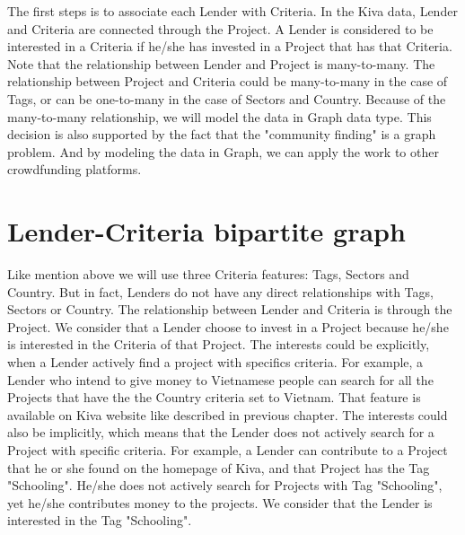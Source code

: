 The first steps is to associate each Lender with Criteria.
In the Kiva data, Lender and Criteria are connected through the Project.
A Lender is considered to be interested in a Criteria if he/she has invested in a Project that has that Criteria.
Note that the relationship between Lender and Project is many-to-many.
The relationship between Project and Criteria could be many-to-many in the case of Tags,
or can be one-to-many in the case of Sectors and Country.
Because of the many-to-many relationship, we will model the data in Graph data type.
This decision is also supported by the fact that the "community finding" is a graph problem.
And by modeling the data in Graph, we can apply the work to other crowdfunding platforms.

\section{Lender-Criteria bipartite graph}

Like mention above we will use three Criteria features: Tags, Sectors and Country.
But in fact, Lenders do not have any direct relationships with Tags, Sectors or Country.
The relationship between Lender and Criteria is through the Project.
We consider that a Lender choose to invest in a Project because he/she is interested in the Criteria of that Project.
The interests could be explicitly, when a Lender actively find a project with specifics criteria.
For example, a Lender who intend to give money to Vietnamese people can search for
all the Projects that have the the Country criteria set to Vietnam.
That feature is available on Kiva website like described in previous chapter.
The interests could also be implicitly, which means that the Lender does not actively search for a Project with specific criteria.
For example, a Lender can contribute to a Project that he or she found on the homepage of Kiva,
and that Project has the Tag "Schooling".
He/she does not actively search for Projects with Tag "Schooling",
yet he/she contributes money to the projects.
We consider that the Lender is interested in the Tag "Schooling".


